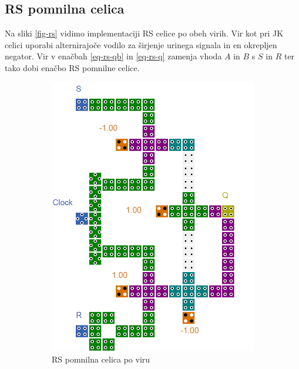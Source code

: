 \documentclass[a4paper, 11pt]{article}
\begin{document}
\subsection{RS pomnilna celica}
Na sliki \ref{fig-rs} vidimo implementaciji RS celice po obeh virih. Vir \cite{quantum_dot} kot pri JK celici uporabi alternirajoče vodilo za širjenje urinega signala in en okrepljen negator. Vir \cite{a_novel_approach} v enačbah \ref{eq-rs-qb} in \ref{eq-rs-q} zamenja vhoda $A$ in $B$ s $S$ in $R$ ter tako dobi enačbo RS pomnilne celice.
\begin{figure}[h!]
	\begin{subfigure}[b]{0.5\textwidth}
	\includegraphics[width=\textwidth]{../img/vir_4/sr.png}
	\caption{RS pomnilna celica po viru \cite{quantum_dot}}
	\label{fig-rs-1}
	\end{subfigure}
	\begin{subfigure}[b]{0.5\textwidth}

\end{subfigure}
\end{figure}
\end{document}
